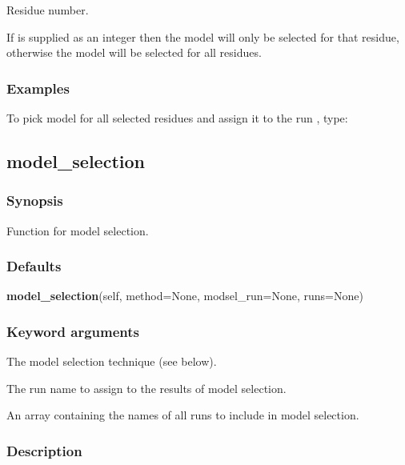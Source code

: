 Residue number.

If 
 is supplied as an integer then the model will only be selected for that
residue, otherwise the model will be selected for all residues.



\subsubsection{Examples}

To pick model 
 for all selected residues and assign it to the run 
, type:





\newpage

\subsection{model\_selection}


\subsubsection{Synopsis}

Function for model selection.

\subsubsection{Defaults}

\textsf{\textbf{model\_selection}(self, method=None, modsel\_run=None, runs=None)}


\subsubsection{Keyword arguments}


  The model selection technique (see below).

  The run name to assign to the results of model selection.

  An array containing the names of all runs to include in model selection.

\subsubsection{Description}


